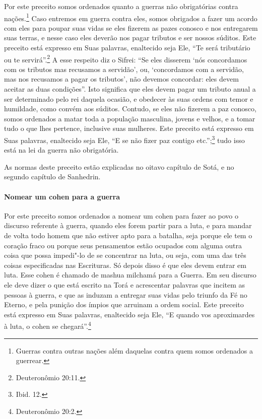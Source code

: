 \begin{multicols}{2}
Por este preceito somos ordenados quanto a guerras não obrigatórias contra nações.\footnote{Guerras contra outras nações além daquelas contra quem somos
  ordenados a guerrear.} Caso entremos em guerra contra eles, somos obrigados
a fazer um acordo com eles para poupar suas vidas se eles fizerem as
pazes conosco e nos entregarem suas terras, e nesse caso eles deverão nos pagar
tributos e ser nossos súditos. Este preceito está expresso em Suas
palavras, enaltecido seja Ele, ``Te será tributário ou te servirá''.\footnote{Deuteronômio 20:11.} A esse respeito diz o Sifrei\starr: ``Se eles disserem
`nós concordamos com os tributos mas recusamos a servidão', ou,
`concordamos com a servidão, mas nos recusamos a pagar os tributos', não
devemos concordar: eles devem aceitar as duas condições''. Isto
significa que eles devem pagar um tributo anual a ser determinado pelo
rei daquela ocasião, e obedecer às suas ordens com temor e humildade,
como convém aos súditos. Contudo, se eles não fizerem a paz conosco,
somos ordenados a matar toda a população masculina, jovens e velhos, e a
tomar tudo o que lhes pertence, inclusive suas mulheres. Este preceito
está expresso em Suas palavras, enaltecido seja Ele, ``E se não fizer
paz contigo etc.'';\footnote{Ibid. 12.} tudo isso está na lei da guerra não
obrigatória.

As normas deste preceito estão explicadas no oitavo capítulo de Sotá\starr, e
no segundo capítulo de Sanhedrin\starr.

\paragraph{Nomear um cohen\starr{} para a guerra}

Por este preceito somos ordenados a nomear um cohen\starr{} para fazer ao
povo o discurso referente à guerra, quando eles forem partir para a
luta, e para mandar de volta todo homem que não estiver apto para a batalha,
seja porque ele tem o coração fraco ou porque seus pensamentos estão
ocupados com alguma outra coisa que possa impedi"-lo de se concentrar na
luta, ou seja, com uma das três coisas especificadas nas Escrituras. Só
depois disso é que eles devem entrar em luta. Esse cohen\starr{} é chamado
de mashua milchamá\starr{} para a Guerra. Em seu discurso ele deve dizer o
que está escrito na Torá\starr{} e acrescentar palavras que incitem as pessoas
à guerra, e que as induzam a entregar suas vidas pelo triunfo da Fé no
Eterno, e pela punição dos ímpios que arruinam a ordem social. Este
preceito está expresso em Suas palavras, enaltecido seja Ele, ``E quando
vos aproximardes à luta, o cohen\starr{} se chegará''.\footnote{Deuteronômio 20:2.}


\end{multicols}
